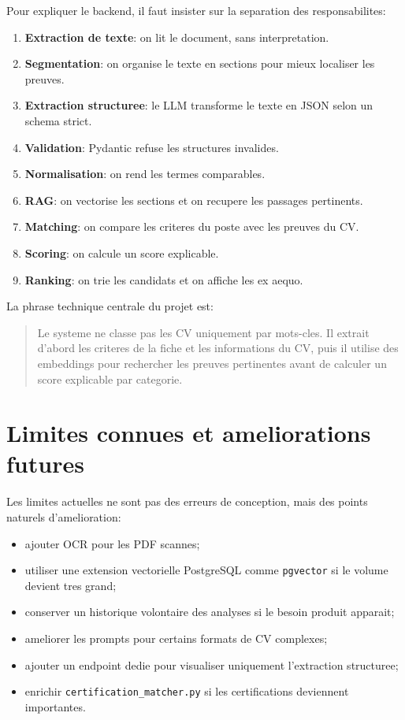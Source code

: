 \documentclass[12pt,a4paper]{article}
\begin{document}
Pour expliquer le backend, il faut insister sur la separation des responsabilites:

\begin{enumerate}
  \item \textbf{Extraction de texte}: on lit le document, sans interpretation.
  \item \textbf{Segmentation}: on organise le texte en sections pour mieux localiser les preuves.
  \item \textbf{Extraction structuree}: le LLM transforme le texte en JSON selon un schema strict.
  \item \textbf{Validation}: Pydantic refuse les structures invalides.
  \item \textbf{Normalisation}: on rend les termes comparables.
  \item \textbf{RAG}: on vectorise les sections et on recupere les passages pertinents.
  \item \textbf{Matching}: on compare les criteres du poste avec les preuves du CV.
  \item \textbf{Scoring}: on calcule un score explicable.
  \item \textbf{Ranking}: on trie les candidats et on affiche les ex aequo.
\end{enumerate}

La phrase technique centrale du projet est:

\begin{quote}
Le systeme ne classe pas les CV uniquement par mots-cles. Il extrait d'abord les criteres de la fiche et les informations du CV, puis il utilise des embeddings pour rechercher les preuves pertinentes avant de calculer un score explicable par categorie.
\end{quote}

\section{Limites connues et ameliorations futures}

Les limites actuelles ne sont pas des erreurs de conception, mais des points naturels d'amelioration:

\begin{itemize}
  \item ajouter OCR pour les PDF scannes;
  \item utiliser une extension vectorielle PostgreSQL comme \texttt{pgvector} si le volume devient tres grand;
  \item conserver un historique volontaire des analyses si le besoin produit apparait;
  \item ameliorer les prompts pour certains formats de CV complexes;
  \item ajouter un endpoint dedie pour visualiser uniquement l'extraction structuree;
  \item enrichir \texttt{certification\_matcher.py} si les certifications deviennent importantes.
\end{itemize}
\end{document}
